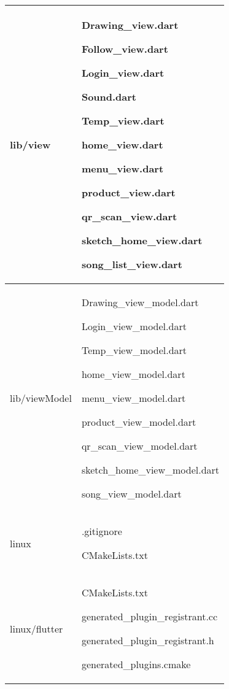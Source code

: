\documentclass[conference]{IEEEtran}
\begin{document}
\begin{table}[h!]
\begin{tabular}{|p{4.1cm}|p{4.1cm}|}
    lib/view & Drawing\_view.dart \par Follow\_view.dart \par Login\_view.dart \par Sound.dart \par Temp\_view.dart \par home\_view.dart \par menu\_view.dart \par product\_view.dart \par qr\_scan\_view.dart \par sketch\_home\_view.dart \par song\_list\_view.dart \\ \hline
    lib/viewModel & Drawing\_view\_model.dart \par Login\_view\_model.dart \par Temp\_view\_model.dart \par home\_view\_model.dart \par menu\_view\_model.dart \par product\_view\_model.dart \par qr\_scan\_view\_model.dart \par sketch\_home\_view\_model.dart \par song\_view\_model.dart \\ \hline
    linux & .gitignore \par CMakeLists.txt \\ \hline
    linux/flutter & CMakeLists.txt \par generated\_plugin\_registrant.cc \par generated\_plugin\_registrant.h \par generated\_plugins.cmake \\ \hline
\end{tabular}
\end{table}

\clearpage
\end{document}
